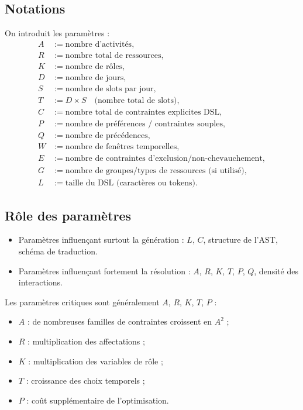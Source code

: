 \documentclass[12pt,a4paper]{article}
\begin{document}
\subsection{Notations}
On introduit les paramètres :
\begin{align*}
A &:= \text{nombre d'activités},\\
R &:= \text{nombre total de ressources},\\
K &:= \text{nombre de rôles},\\
D &:= \text{nombre de jours},\\
S &:= \text{nombre de slots par jour},\\
T &:= D\times S \quad \text{(nombre total de slots)},\\
C &:= \text{nombre total de contraintes explicites DSL},\\
P &:= \text{nombre de préférences / contraintes souples},\\
Q &:= \text{nombre de précédences},\\
W &:= \text{nombre de fenêtres temporelles},\\
E &:= \text{nombre de contraintes d'exclusion/non-chevauchement},\\
G &:= \text{nombre de groupes/types de ressources (si utilisé)},\\
L &:= \text{taille du DSL (caractères ou tokens)}.
\end{align*}

\subsection{Rôle des paramètres}
\begin{itemize}
  \item Paramètres influençant surtout la génération : $L$, $C$, structure de l'AST, schéma de traduction.
  \item Paramètres influençant fortement la résolution : $A$, $R$, $K$, $T$, $P$, $Q$, densité des interactions.
\end{itemize}

Les paramètres critiques sont généralement $A$, $R$, $K$, $T$, $P$ :
\begin{itemize}
  \item $A$ : de nombreuses familles de contraintes croissent en $A^2$ ;
  \item $R$ : multiplication des affectations ;
  \item $K$ : multiplication des variables de rôle ;
  \item $T$ : croissance des choix temporels ;
  \item $P$ : coût supplémentaire de l'optimisation.
\end{itemize}
\end{document}
